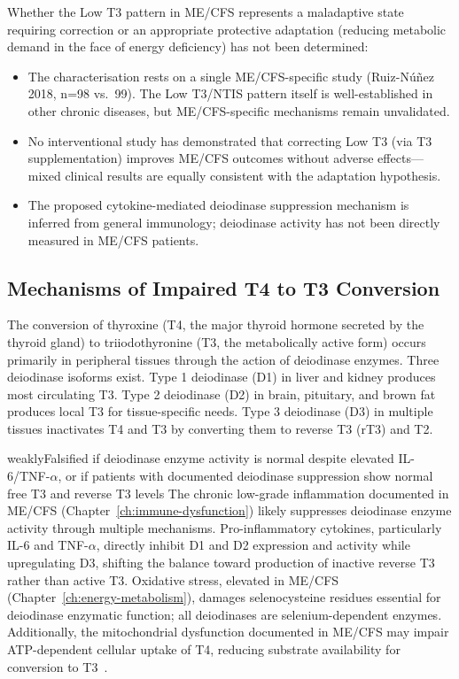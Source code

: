 \begin{limitation}
Whether the Low T3 pattern in ME/CFS represents a maladaptive state requiring correction or an appropriate protective adaptation (reducing metabolic demand in the face of energy deficiency) has not been determined:
\begin{itemize}
    \item The characterisation rests on a single ME/CFS-specific study (Ruiz-N\'{u}\~{n}ez 2018, n=98 vs.\ 99). The Low T3/NTIS pattern itself is well-established in other chronic diseases, but ME/CFS-specific mechanisms remain unvalidated.
    \item No interventional study has demonstrated that correcting Low T3 (via T3 supplementation) improves ME/CFS outcomes without adverse effects---mixed clinical results are equally consistent with the adaptation hypothesis.
    \item The proposed cytokine-mediated deiodinase suppression mechanism is inferred from general immunology; deiodinase activity has not been directly measured in ME/CFS patients.
\end{itemize}
\end{limitation}

\subsection{Mechanisms of Impaired T4 to T3 Conversion}

The conversion of thyroxine (T4, the major thyroid hormone secreted by the thyroid gland) to triiodothyronine (T3, the metabolically active form) occurs primarily in peripheral tissues through the action of deiodinase enzymes. Three deiodinase isoforms exist. Type 1 deiodinase (D1) in liver and kidney produces most circulating T3. Type 2 deiodinase (D2) in brain, pituitary, and brown fat produces local T3 for tissue-specific needs. Type 3 deiodinase (D3) in multiple tissues inactivates T4 and T3 by converting them to reverse T3 (rT3) and T2.

\begin{fhypothesis}{weakly}{Falsified if deiodinase enzyme activity is normal despite elevated IL-6/TNF-$\alpha$, or if patients with documented deiodinase suppression show normal free T3 and reverse T3 levels}
\label{hyp:deiodinase-suppression}
The chronic low-grade inflammation documented in ME/CFS (Chapter~\ref{ch:immune-dysfunction}) likely suppresses deiodinase enzyme activity through multiple mechanisms. Pro-inflammatory cytokines, particularly IL-6 and TNF-$\alpha$, directly inhibit D1 and D2 expression and activity while upregulating D3, shifting the balance toward production of inactive reverse T3 rather than active T3. Oxidative stress, elevated in ME/CFS (Chapter~\ref{ch:energy-metabolism}), damages selenocysteine residues essential for deiodinase enzymatic function; all deiodinases are selenium-dependent enzymes. Additionally, the mitochondrial dysfunction documented in ME/CFS may impair ATP-dependent cellular uptake of T4, reducing substrate availability for conversion to T3~\cite{ruiznunez2018thyroid}.
\end{fhypothesis}

